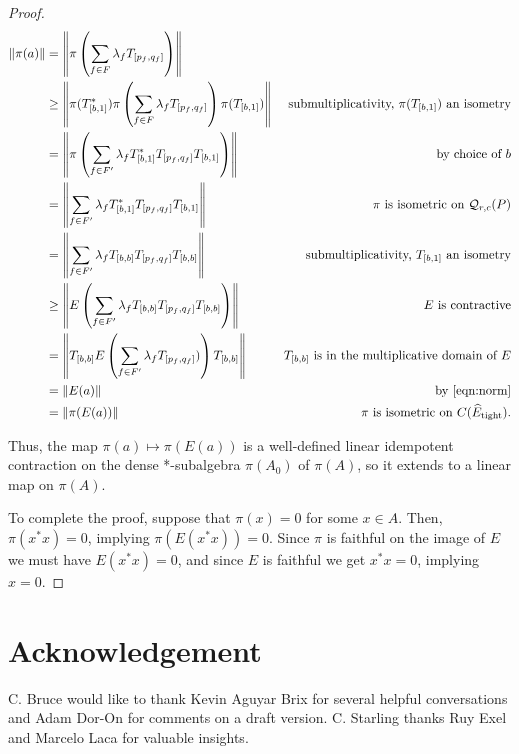 \documentclass[12pt]{amsart}
\theoremstyle{definition}
\theoremstyle{remark}
\numberwithin{equation}{section}
\newcommand{\Q}{\mathcal{Q}}
\newcommand{\Et}{\widehat E_{\text{tight}}}
\begin{document}
\begin{proof}
\begin{align*}
	\|\pi(a)\| &= \left\|\pi\left(\sum_{f\in F}\lambda_fT_{[p_f, q_f]}\right)\right\|\\
	           &\geq \left\|\pi(T_{[b,1]}^*)\pi\left(\sum_{f\in F}\lambda_fT_{[p_f, q_f]}\right)\pi(T_{[b,1]})\right\|&\text{submultiplicativity, $\pi(T_{[b,1]})$ an isometry}\\
	           &= \left\|\pi\left(\sum_{f\in F'}\lambda_fT_{[b,1]}^*T_{[p_f, q_f]}T_{[b,1]}\right)\right\|&\text{by choice of $b$}\\
	           & = \left\|\sum_{f\in F'}\lambda_fT_{[b,1]}^*T_{[p_f, q_f]}T_{[b,1]}\right\|&\text{$\pi$ is isometric on $\Q_{r,c}(P)$}\\
	           &=  \left\|\sum_{f\in F'}\lambda_fT_{[b,b]}T_{[p_f, q_f]}T_{[b,b]}\right\|&\text{submultiplicativity, $T_{[b,1]}$ an isometry}\\
	           &\geq  \left\|E\left(\sum_{f\in F'}\lambda_fT_{[b,b]}T_{[p_f, q_f]}T_{[b,b]}\right)\right\|&\text{$E$ is contractive}\\
            &=\left\|T_{[b,b]}E\left(\sum_{f\in F'}\lambda_fT_{[p_f, q_f]})\right)T_{[b,b]}\right\|&\text{$T_{[b,b]}$ is in the multiplicative domain of $E$}\\
	           & = \|E(a)\| & \text{by \eqref{eqn:norm}}\\
	           & = \|\pi(E(a))\| & \text{$\pi$ is isometric on $C(\Et)$}.
\end{align*}

Thus, the map $\pi(a) \mapsto \pi(E(a))$ is a well-defined linear idempotent contraction on the dense *-subalgebra $\pi(A_0)$ of $\pi(A)$, so it extends to a linear map on $\pi(A)$.  

To complete the proof, suppose that $\pi(x) = 0$ for some $x\in A$. Then, $\pi(x^*x) = 0$, implying $\pi(E(x^*x)) = 0$. Since $\pi$ is faithful on the image of $E$ we must have $E(x^*x) = 0$, and since $E$ is faithful we get $x^*x = 0$, implying $x=0$.  
\end{proof}


\section*{Acknowledgement} C. Bruce would like to thank Kevin Aguyar Brix for several helpful conversations and Adam Dor-On for comments on a draft version. C. Starling thanks Ruy Exel and Marcelo Laca for valuable insights.
\end{document}
